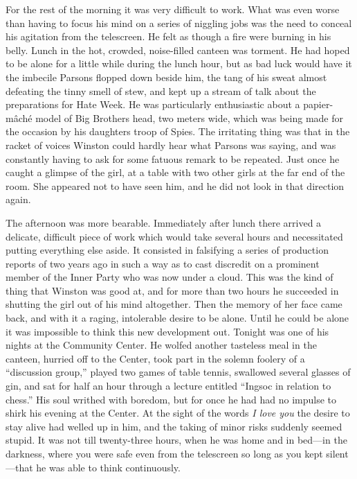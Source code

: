 For the rest of the morning it was very difficult to work. What was even
worse than having to focus his mind on a series of niggling jobs was the
need to conceal his agitation from the telescreen. He felt as though a
fire were burning in his belly. Lunch in the hot, crowded, noise-filled
canteen was torment. He had hoped to be alone for a little while during
the lunch hour, but as bad luck would have it the imbecile Parsons
flopped down beside him, the tang of his sweat almost defeating the
tinny smell of stew, and kept up a stream of talk about the preparations
for Hate Week. He was particularly enthusiastic about a papier-mâché
model of Big Brother\textquotesingle s head, two meters wide, which was
being made for the occasion by his daughter\textquotesingle s troop of
Spies. The irritating thing was that in the racket of voices Winston
could hardly hear what Parsons was saying, and was constantly having to
ask for some fatuous remark to be repeated. Just once he caught a
glimpse of the girl, at a table with two other girls at the far end of
the room. She appeared not to have seen him, and he did not look in that
direction again.

The afternoon was more bearable. Immediately after lunch there arrived a
delicate, difficult piece of work which would take several hours and
necessitated putting everything else aside. It consisted in falsifying a
series of production reports of two years ago in such a way as to cast
discredit on a prominent member of the Inner Party who was now under a
cloud. This was the kind of thing that Winston was good at, and for more
than two hours he succeeded in shutting the girl out of his mind
altogether. Then the memory of her face came back, and with it a raging,
intolerable desire to be alone. Until he could be alone it was
impossible to think this new development out. Tonight was one of his
nights at the Community Center. He wolfed another tasteless meal in the
canteen, hurried off to the Center, took part in the solemn foolery of a
``discussion group,'' played two games of table tennis, swallowed several
glasses of gin, and sat for half an hour through a lecture entitled
``Ingsoc in relation to chess.'' His soul writhed with boredom, but for
once he had had no impulse to shirk his evening at the Center. At the
sight of the words \emph{I love you} the desire to stay alive had welled
up in him, and the taking of minor risks suddenly seemed stupid. It was
not till twenty-three hours, when he was home and in bed---in the
darkness, where you were safe even from the telescreen so long as you
kept silent---that he was able to think continuously.

